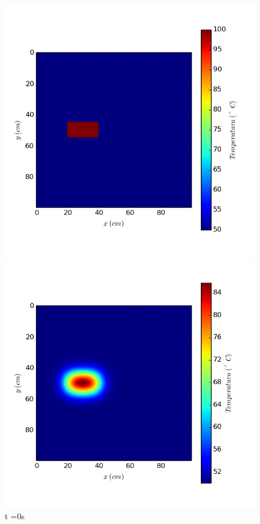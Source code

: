 \documentclass{article}
\begin{document}
\begin{figure}[H]
  \includegraphics[width=\linewidth]{abiertasNOCte0.png}
  \caption{t =0s}\label{fig:awesome_image1}
\endminipage\hfill
{}
  \includegraphics[width=\linewidth]{abiertasNOCte100.png}

\end{figure}
\end{document}
